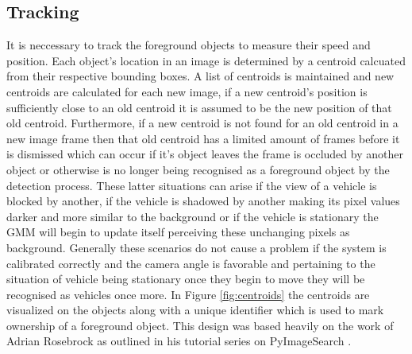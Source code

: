 \subsection{Tracking}

It is neccessary to track the foreground objects to measure their speed and position. Each object's location in an image is determined by a centroid calcuated from their respective bounding boxes. A list of centroids is maintained and new centroids are calculated for each new image, if a new centroid's position is sufficiently close to an old centroid it is assumed to be the new position of that old centroid. Furthermore, if a new centroid is not found for an old centroid in a new image frame then that old centroid has a limited amount of frames before it is dismissed which can occur if it's object leaves the frame is occluded by another object or otherwise is no longer being recognised as a foreground object by the detection process. These latter situations can arise if the view of a vehicle is blocked by another, if the vehicle is shadowed by another making its pixel values darker and more similar to the background or if the vehicle is stationary the GMM will begin to update itself perceiving these unchanging pixels as background. Generally these scenarios do not cause a problem if the system is calibrated correctly and the camera angle is favorable and pertaining to the situation of vehicle being stationary once they begin to move they will be recognised as vehicles once more. In Figure \ref{fig:centroids} the centroids are visualized on the objects along with a unique identifier which is used to mark ownership of a foreground object. This design was based heavily on the work of Adrian Rosebrock as outlined in his tutorial series on PyImageSearch \cite{adrian_rosebrock_simple_object_tracking}\cite{adrian_rosebrock_vehicle_tracking}.

